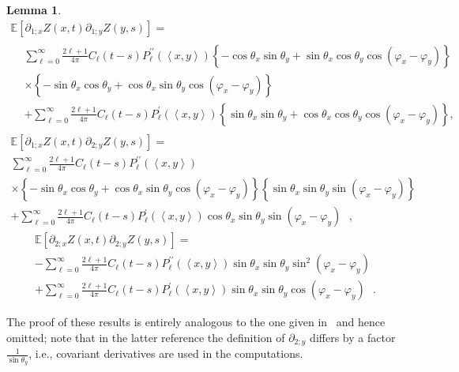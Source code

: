 \documentclass[10pt]{amsart}
\newtheorem{lemm}[theo]{Lemma}\newtheorem{prop}[theo]{Proposition}\newtheorem{coro}[theo]{Corollary}\newtheorem{conj}[theo]{Conjecture}
\theoremstyle{definition}\newtheorem{defi}[theo]{Definition}\newtheorem{rema}[theo]{Remark}\newtheorem{exam}[theo]{Example}\newtheorem{exem}[theo]{Example}\newtheorem{nota}[theo]{Notation}
\newcommand{\bbE}{\mathbb{E}}
\begin{document}
\begin{lemm}
\begin{multline*}
\bbE\left[\partial _{1;x}Z(x,t)\partial _{1;y}Z(y,s)\right] =
\\
\begin{aligned}
&\sum_{\ell =0}^{\infty }\frac{2\ell +1}{4\pi }C_{\ell }(t-s)P_{\ell }^{\prime \prime }(\left\langle x,y\right\rangle)\left\{ -\cos \theta _{x}\sin \theta _{y}+\sin \theta _{x}\cos \theta _{y}\cos (\varphi _{x}-\varphi _{y})\right\} \\
&\times \left\{ -\sin \theta _{x}\cos \theta _{y}+\cos \theta _{x}\sin
\theta _{y}\cos (\varphi _{x}-\varphi _{y})\right\} \\
&+\sum_{\ell =0}^{\infty }\frac{2\ell +1}{4\pi }C_{\ell }(t-s)P_{\ell }^{\prime }(\left\langle x,y\right\rangle)\left\{ \sin \theta _{x}\sin
\theta _{y}+\cos \theta _{x}\cos \theta _{y}\cos (\varphi _{x}-\varphi _{y})\right\} \text{,}
\end{aligned}
\end{multline*}
\begin{multline*}
\bbE\left[\partial _{1;x}Z(x,t)\partial _{2;y}Z(y,s)\right] =
\\
\sum_{\ell =0}^{\infty }\frac{2\ell +1}{4\pi }C_{\ell }(t-s)P_{\ell }^{\prime \prime }(\left\langle x,y\right\rangle) \\
\times \left\{ -\sin \theta _{x}\cos \theta _{y}+\cos \theta _{x}\sin
\theta _{y}\cos (\varphi _{x}-\varphi _{y})\right\} \left\{ \sin \theta _{x}\sin \theta _{y}\sin (\varphi _{x}-\varphi _{y})\right\} \\
+\sum_{\ell =0}^{\infty }\frac{2\ell +1}{4\pi }C_{\ell }(t-s)P_{\ell }^{\prime }(\left\langle x,y\right\rangle)\cos \theta _{x}\sin \theta _{y}\sin (\varphi _{x}-\varphi _{y})\text{ },
\end{multline*}
\begin{multline*}
\bbE\left[\partial _{2;x}Z(x,t)\partial _{2;y}Z(y,s)\right] =
\\
-\sum_{\ell =0}^{\infty }\frac{2\ell +1}{4\pi }C_{\ell }(t-s)P_{\ell }^{\prime \prime }(\left\langle x,y\right\rangle)\sin \theta _{x}\sin
\theta _{y}\sin ^{2}(\varphi _{x}-\varphi _{y}) \\
+\sum_{\ell =0}^{\infty }\frac{2\ell +1}{4\pi }C_{\ell }(t-s)P_{\ell }^{\prime }(\left\langle x,y\right\rangle)\sin \theta _{x}\sin \theta _{y}\cos (\varphi _{x}-\varphi _{y})\text{ }.
\end{multline*}
\end{lemm}

The proof of these results is entirely analogous to the one given in~\cite[App\-endix]{CM20} and hence omitted; note that in the latter reference the definition of $\partial _{2;y}$ differs by a factor $\frac{1}{\sin \theta_{y}}$, i.e., covariant derivatives are used in the computations.
\end{document}
